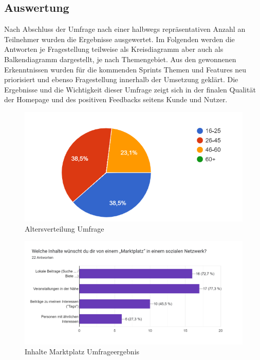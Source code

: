 \subsection{Auswertung}

Nach Abschluss der Umfrage nach einer halbwegs repräsentativen Anzahl an Teilnehmer wurden die Ergebnisse ausgewertet. Im Folgenden werden die Antworten je Fragestellung teilweise als Kreisdiagramm aber auch als Balkendiagramm dargestellt, je nach Themengebiet. Aus den gewonnenen Erkenntnissen wurden für die kommenden Sprints Themen und Features neu priorisiert und ebenso Fragestellung innerhalb der Umsetzung geklärt. Die Ergebnisse und die Wichtigkeit dieser Umfrage zeigt sich in der finalen Qualität der Homepage und des positiven Feedbacks seitens Kunde und Nutzer.

\begin{figure}[!htb]
    \centering
    \includegraphics[width=1\textwidth]{figures/daniel/Bild-3.png}
    \caption[shortcaption]{Altersverteilung Umfrage}
    \label{fig:bild3}
\end{figure}

\begin{figure}[!htb]
    \centering
    \includegraphics[width=1\textwidth]{figures/daniel/Bild-4.png}
    \caption[shortcaption]{Inhalte Marktplatz Umfrageergebnis}
    \label{fig:bild4}
\end{figure}

